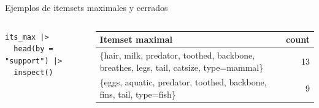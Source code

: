 \documentclass[10pt,aspectratio=169]{beamer}
\begin{document}
\begin{frame}[fragile]{Ejemplos de itemsets maximales y cerrados}
\begin{columns}[T]
\begin{lstlisting}[style=rcode]
its_max |>
  head(by = "support") |>
  inspect()
\end{lstlisting}
\scriptsize
\begin{tabular}{lr}
\toprule
Itemset maximal & count \\
\midrule
\{hair, milk, predator, toothed, backbone, breathes, legs, tail, catsize, type=mammal\} & 13 \\
\{eggs, aquatic, predator, toothed, backbone, fins, tail, type=fish\} & 9 \\
\bottomrule
\end{tabular}

\end{columns}
\end{frame}
\end{document}
